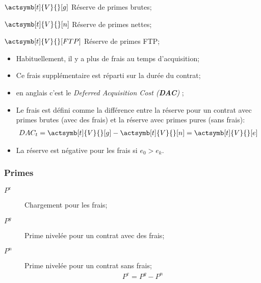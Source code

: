 \documentclass[10pt, french]{article}
\begin{document}
\begin{multicols*}{2}
\begin{description}
	\item	$\actsymb[t]{V}{}[g]$	Réserve de primes brutes;
	\item	$\actsymb[t]{V}{}[n]$	Réserve de primes nettes;
	\item	$\actsymb[t]{V}{}[FTP]$	Réserve de primes FTP;
\end{description}


\begin{itemize}[leftmargin = *]
	\item	Habituellement, il y a plus de frais au temps d'acquisition;
	\item	Ce frais supplémentaire est réparti sur la durée du contrat;
	\item	en anglais c'est le \og \textit{Deferred Acquisition Cost (\textbf{DAC})} \fg{};
	\item	Le frais est défini comme la différence entre la réserve pour un contrat avec primes brutes (avec des frais) et la réserve avec primes pures (sans frais):
		\begin{align*}
		DAC_{t}	
		=	\actsymb[t]{V}{}[g] - \actsymb[t]{V}{}[n] 
		= 	\actsymb[t]{V}{}[e]
		\end{align*}
	\item	La réserve est négative pour les frais si $e_{0} > e_{k}$.
\end{itemize}

\subsubsection{Primes}
\begin{description}
	\item[$P^{e}$]	Chargement pour les frais;
	\item[$P^{g}$]	Prime nivelée pour un contrat avec des frais;
	\item[$P^{n}$]	Prime nivelée pour un contrat sans frais;
		\begin{align*}
		P^{e}	=	P^{g}	-	P^{n}
		\end{align*}
\end{description}





\end{multicols*}
\end{document}
